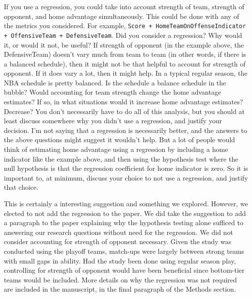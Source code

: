 \documentclass[12pt]{article}
\newenvironment{comment}%
{\begin{quoting}\noindent\small\it\ignorespaces%
  }{\end{quoting}}
\begin{document}
 
\begin{comment}
If you use a regression, you could take into account strength of team,
strength of opponent, and home advantage simultaneously. This could 
be done with any of the metrics you considered. For example,
\texttt{Score  + HomeTeamOnOffenseIndicator + OffensiveTeam + DefensiveTeam}.
Did you consider a regression? Why would it, or would it not, be useful? 
If strength of opponent (in the example above, the DefensiveTeam) doesn’t
vary much from team to team (in other words, if there is a
balanced schedule), then it might not be that helpful to account for 
strength of opponent. If it does vary a lot, then it might help.
In a typical regular season, the NBA schedule is pretty balanced. 
Is the schedule a balance schedule in the bubble?
Would accounting for team strength change the home advantage estimates? If so, 
in what situations would it increase home advantage estimates? Decrease?
You don’t necessarily have to do all of this analysis, but you should at least 
discuss somewhere why you didn’t use a regression, and justify your decision.
I’m not saying that a regression is necessarily better, and the answers to 
the above questions might suggest it wouldn’t help. But a lot of people
would think of estimating home advantage using a regression by including a home 
indicator like the example above, and then using the hypothesis test where 
the null hypothesis is that the regression coefficient for home indicator
is zero. So it is important to, at minimum, discuss your choice to not use
a regression, and justify that
choice.
\end{comment}

 This is certainly a interesting suggestion and something we explored. However, we 
 elected to not add the regression to the paper. We did take the suggestion to add
 a paragraph to the paper explaining why the hypothesis testing alone sufficed to
 answering our research questions without need for the regression. We did not
 consider accounting for strength of opponent necessary. Given the study was 
 conducted using the playoff teams, match-ups were largely between strong teams 
 with small gaps in ability. Had the study been done using regular season play, 
 controlling for strength of opponent would have been beneficial since bottom-tier 
 teams would be included. More details on why the regression was not required are 
 included in the manuscript, in the final paragraph of the Methods section.
\end{document}
